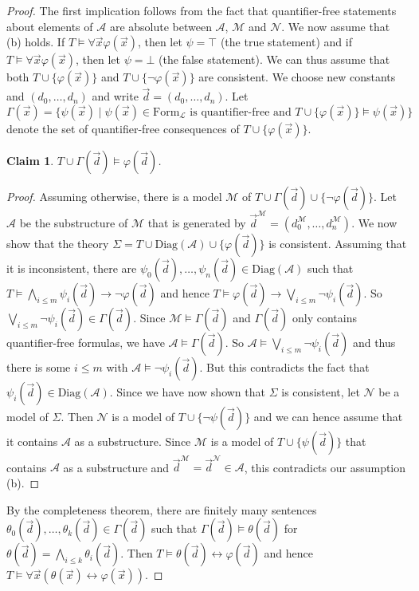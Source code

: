 \documentclass[10pt]{amsart}
\renewcommand{\L}{\mathcal{L}}
\newcommand{\MM}{\mathcal{M}}
\newcommand{\NN}{\mathcal{N}}
\renewcommand{\AA}{\mathcal{A}}
\newtheorem{claim}[theorem]{Claim}
\theoremstyle{definition}
\theoremstyle{remark}
\begin{document}
\begin{proof} 
The first implication follows from the fact that quantifier-free statements about elements of $\AA$ are absolute between $\AA$, $\MM$ and $\NN$. 
We now assume that (b) holds. If $T\models \forall \vec{x} \varphi(\vec{x})$, then let $\psi=\top$ (the true statement) and if $T\models \forall \vec{x} \varphi(\vec{x})$, then let $\psi=\bot$ (the false statement). We can thus assume that both $T\cup\{\varphi(\vec{x})\}$ and $T\cup\{\neg\varphi(\vec{x})\}$ are consistent. We choose new constants  and $(d_0,\dots,d_n)$ and write $\vec{d}=(d_0,\dots,d_n)$. 
Let 
$$\Gamma(\vec{x})=\{\psi(\vec{x})\mid\psi(\vec{x})\in\mathrm{Form}_{\L}\text{ is quantifier-free and }T\cup\{\varphi(\vec{x})\}\models\psi(\vec{x})\}$$ denote the set of quantifier-free consequences of $T\cup\{\varphi(\vec{x})\}$. 

\begin{claim} 
$T\cup \Gamma(\vec{d})\models\varphi(\vec{d})$. 
\end{claim} 
\begin{proof} 
Assuming otherwise, there is a model $\MM$ of $T\cup \Gamma(\vec{d})\cup\{\neg\varphi(\vec{d})\}$. Let $\AA$ be the substructure of $\MM$ that is generated by $\vec{d}^\MM=(d_0^\MM,\dots,d_n^\MM)$. 
We now show that the theory $\Sigma=T\cup\mathrm{Diag}(\AA)\cup\{\varphi(\vec{d})\}$ is consistent. Assuming that it is inconsistent, there are $\psi_0(\vec{d}),\dots,\psi_n(\vec{d})\in\mathrm{Diag}(\AA)$ such that $T\models \bigwedge_{i\leq m}\psi_i(\vec{d}) \rightarrow \neg\varphi(\vec{d})$ and hence $T\models \varphi(\vec{d})\rightarrow \bigvee_{i\leq m}\neg\psi_i(\vec{d})$. So $\bigvee_{i\leq m}\neg\psi_i(\vec{d})\in \Gamma(\vec{d})$. Since $\MM\models \Gamma(\vec{d})$ and $\Gamma(\vec{d})$ only contains quantifier-free formulas, we have $\AA\models \Gamma(\vec{d})$. So $\AA\models \bigvee_{i\leq m}\neg\psi_i(\vec{d})$ and thus there is some $i\leq m$ with $\AA\models \neg\psi_i(\vec{d})$. But this contradicts the fact that $\psi_i(\vec{d})\in \mathrm{Diag}(\AA)$. 
Since we have now shown that $\Sigma$ is consistent, let $\NN$ be a model of $\Sigma$. Then $\NN$ is a model of $T\cup\{\neg\psi(\vec{d})\}$ and we can hence assume that it contains $\AA$ as a substructure. Since $\MM$ is a model of $T\cup\{\psi(\vec{d})\}$ that contains $\AA$ as a substructure and $\vec{d}^\MM=\vec{d}^\NN\in \AA$, this contradicts our assumption (b). 
\end{proof} 

By the completeness theorem, there are finitely many sentences $\theta_0(\vec{d}),\dots,\theta_k(\vec{d})\in \Gamma(\vec{d})$ such that $\Gamma(\vec{d})\models \theta(\vec{d})$ for $\theta(\vec{d})=\bigwedge_{i\leq k}\theta_i(\vec{d})$. Then $T\models\theta(\vec{d})\leftrightarrow \varphi(\vec{d})$ and hence $T\models \forall \vec{x}(\theta(\vec{x})\leftrightarrow \varphi(\vec{x}))$. 
\end{proof} 
\end{document}
